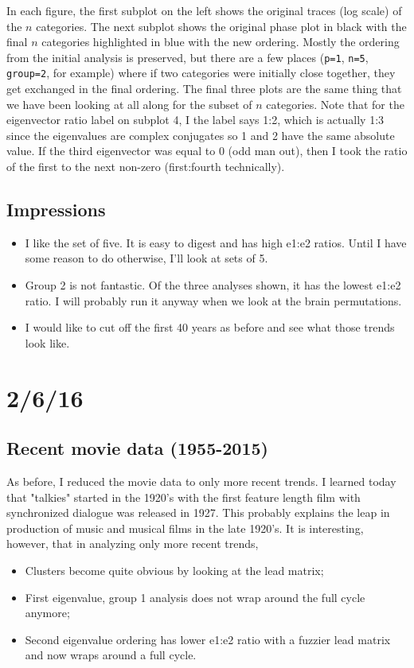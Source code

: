 \documentclass[11pt]{article}
\begin{document}
In each figure, the first subplot on the left shows the original traces (log scale) of the $n$ categories. The next subplot shows the original phase plot in black with the final $n$ categories highlighted in blue with the new ordering. Mostly the ordering from the initial analysis is preserved, but there are a few places (\verb|p=1|, \verb|n=5|, \verb|group=2|, for example) where if two categories were initially close together, they get exchanged in the final ordering. The final three plots are the same thing that we have been looking at all along for the subset of $n$ categories. Note that for the eigenvector ratio label on subplot 4, I the label says 1:2, which is actually 1:3 since the eigenvalues are complex conjugates so 1 and 2 have the same absolute value. If the third eigenvector was equal to 0 (odd man out), then I took the ratio of the first to the next non-zero (first:fourth technically).

\subsection{Impressions}
\begin{itemize}
\item I like the set of five. It is easy to digest and has high e1:e2 ratios. Until I have some reason to do otherwise,  I'll look at sets of 5.
\item Group 2 is not fantastic. Of the three analyses shown, it has the lowest e1:e2 ratio. I will probably run it anyway when we look at the brain permutations.
\item I would like to cut off the first 40 years as before and see what those trends look like.
\end{itemize}

\section{2/6/16}
\subsection{Recent movie data (1955-2015)}
As before, I reduced the movie data to only more recent trends. I learned today that "talkies" started in the 1920's with the first feature length film with synchronized dialogue was released in 1927. This probably explains the leap in production of music and musical films in the late 1920's. It is interesting, however, that in analyzing only more recent trends, 
\begin{itemize}
\item Clusters become quite obvious by looking at the lead matrix;
\item First eigenvalue, group 1 analysis does not wrap around the full cycle anymore;
\item Second eigenvalue ordering has lower e1:e2 ratio with a fuzzier lead matrix and now wraps around a full cycle.
\end{itemize}
\end{document}

